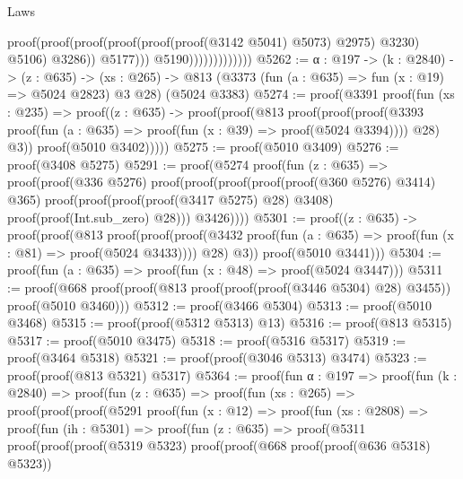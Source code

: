 \begin{lexlean}{Laws}
\begin{coremodule}
                                                    proof(proof(proof(proof(proof(proof(@3142 @5041)
                                                                @5073)
                                                              @2975)
                                                            @3230)
                                                          @5106)
                                                        @3286))
                                                  @5177)))
                                        @5190)))))))))))))
@5262 := {α : @197} ->
  (k : @2840) ->
  (z : @635) ->
  (xs : @265) -> @813 (@3373 (fun (a : @635) => fun (x : @19) => @5024 @2823) @3 @28) (@5024 @3383)
@5274 := proof(@3391
      proof(fun (xs : @235) =>
        proof((z : @635) ->
          proof(proof(@813
                proof(proof(proof(@3393
                        proof(fun (a : @635) => proof(fun (x : @39) => proof(@5024 @3394))))
                      @28)
                    @3))
              proof(@5010 @3402)))))
@5275 := proof(@5010 @3409)
@5276 := proof(@3408 @5275)
@5291 := proof(@5274
      proof(fun (z : @635) =>
        proof(proof(@336 @5276)
            proof(proof(proof(proof(proof(@360 @5276) @3414) @365)
                  proof(proof(proof(proof(@3417 @5275) @28) @3408) proof(proof(Int.sub_zero) @28)))
                @3426))))
@5301 := proof((z : @635) ->
    proof(proof(@813
          proof(proof(proof(@3432
                  proof(fun (a : @635) => proof(fun (x : @81) => proof(@5024 @3433))))
                @28)
              @3))
        proof(@5010 @3441)))
@5304 := proof(fun (a : @635) => proof(fun (x : @48) => proof(@5024 @3447)))
@5311 := proof(@668
      proof(proof(@813 proof(proof(proof(@3446 @5304) @28) @3455)) proof(@5010 @3460)))
@5312 := proof(@3466 @5304)
@5313 := proof(@5010 @3468)
@5315 := proof(proof(@5312 @5313) @13)
@5316 := proof(@813 @5315)
@5317 := proof(@5010 @3475)
@5318 := proof(@5316 @5317)
@5319 := proof(@3464 @5318)
@5321 := proof(proof(@3046 @5313) @3474)
@5323 := proof(proof(@813 @5321) @5317)
@5364 := proof(fun {α : @197} =>
    proof(fun (k : @2840) =>
      proof(fun (z : @635) =>
        proof(fun (xs : @265) =>
          proof(proof(proof(@5291
                  proof(fun (x : @12) =>
                    proof(fun (xs : @2808) =>
                      proof(fun (ih : @5301) =>
                        proof(fun (z : @635) =>
                          proof(@5311
                              proof(proof(proof(@5319 @5323)
                                    proof(proof(@668 proof(proof(@636 @5318) @5323))

\end{coremodule}
\end{lexlean}
